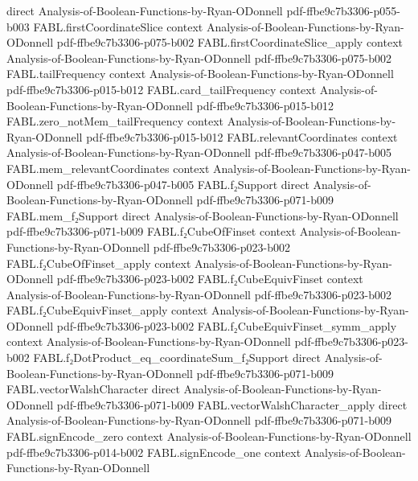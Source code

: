 \begin{theorem}
  {direct}
  {Analysis-of-Boolean-Functions-by-Ryan-ODonnell}
  {pdf-ffbe9c7b3306-p055-b003}
\proofstep
  {FABL.firstCoordinateSlice}
  {context}
  {Analysis-of-Boolean-Functions-by-Ryan-ODonnell}
  {pdf-ffbe9c7b3306-p075-b002}
\proofstep
  {FABL.firstCoordinateSlice_apply}
  {context}
  {Analysis-of-Boolean-Functions-by-Ryan-ODonnell}
  {pdf-ffbe9c7b3306-p075-b002}
\proofstep
  {FABL.tailFrequency}
  {context}
  {Analysis-of-Boolean-Functions-by-Ryan-ODonnell}
  {pdf-ffbe9c7b3306-p015-b012}
\proofstep
  {FABL.card_tailFrequency}
  {context}
  {Analysis-of-Boolean-Functions-by-Ryan-ODonnell}
  {pdf-ffbe9c7b3306-p015-b012}
\proofstep
  {FABL.zero_notMem_tailFrequency}
  {context}
  {Analysis-of-Boolean-Functions-by-Ryan-ODonnell}
  {pdf-ffbe9c7b3306-p015-b012}
\proofstep
  {FABL.relevantCoordinates}
  {context}
  {Analysis-of-Boolean-Functions-by-Ryan-ODonnell}
  {pdf-ffbe9c7b3306-p047-b005}
\proofstep
  {FABL.mem_relevantCoordinates}
  {context}
  {Analysis-of-Boolean-Functions-by-Ryan-ODonnell}
  {pdf-ffbe9c7b3306-p047-b005}
\proofstep
  {FABL.f₂Support}
  {direct}
  {Analysis-of-Boolean-Functions-by-Ryan-ODonnell}
  {pdf-ffbe9c7b3306-p071-b009}
\proofstep
  {FABL.mem_f₂Support}
  {direct}
  {Analysis-of-Boolean-Functions-by-Ryan-ODonnell}
  {pdf-ffbe9c7b3306-p071-b009}
\proofstep
  {FABL.f₂CubeOfFinset}
  {context}
  {Analysis-of-Boolean-Functions-by-Ryan-ODonnell}
  {pdf-ffbe9c7b3306-p023-b002}
\proofstep
  {FABL.f₂CubeOfFinset_apply}
  {context}
  {Analysis-of-Boolean-Functions-by-Ryan-ODonnell}
  {pdf-ffbe9c7b3306-p023-b002}
\proofstep
  {FABL.f₂CubeEquivFinset}
  {context}
  {Analysis-of-Boolean-Functions-by-Ryan-ODonnell}
  {pdf-ffbe9c7b3306-p023-b002}
\proofstep
  {FABL.f₂CubeEquivFinset_apply}
  {context}
  {Analysis-of-Boolean-Functions-by-Ryan-ODonnell}
  {pdf-ffbe9c7b3306-p023-b002}
\proofstep
  {FABL.f₂CubeEquivFinset_symm_apply}
  {context}
  {Analysis-of-Boolean-Functions-by-Ryan-ODonnell}
  {pdf-ffbe9c7b3306-p023-b002}
\proofstep
  {FABL.f₂DotProduct_eq_coordinateSum_f₂Support}
  {direct}
  {Analysis-of-Boolean-Functions-by-Ryan-ODonnell}
  {pdf-ffbe9c7b3306-p071-b009}
\proofstep
  {FABL.vectorWalshCharacter}
  {direct}
  {Analysis-of-Boolean-Functions-by-Ryan-ODonnell}
  {pdf-ffbe9c7b3306-p071-b009}
\proofstep
  {FABL.vectorWalshCharacter_apply}
  {direct}
  {Analysis-of-Boolean-Functions-by-Ryan-ODonnell}
  {pdf-ffbe9c7b3306-p071-b009}
\proofstep
  {FABL.signEncode_zero}
  {context}
  {Analysis-of-Boolean-Functions-by-Ryan-ODonnell}
  {pdf-ffbe9c7b3306-p014-b002}
\proofstep
  {FABL.signEncode_one}
  {context}
  {Analysis-of-Boolean-Functions-by-Ryan-ODonnell}

\end{theorem}
